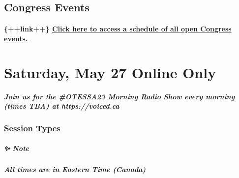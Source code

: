 \documentclass[
]{book}
\begin{document}
\hypertarget{congress-events}{%
\section*{Congress Events}\label{congress-events}}

\begin{vendor}
\hypertarget{link-click-here-to-access-a-schedule-of-all-open-congress-events.}{%
\subsubsection{\texorpdfstring{\{++link++\} \href{}{Click here to access
a schedule of all open Congress
events.}}{\{++link++\} Click here to access a schedule of all open Congress events.}}\label{link-click-here-to-access-a-schedule-of-all-open-congress-events.}}
\end{vendor}

\hypertarget{saturday-may-27-online-only}{%
\chapter{Saturday, May 27 \textbar{} Online Only}\label{saturday-may-27-online-only}}

\begin{protip}
\hypertarget{join-us-for-the-otessa23-morning-radio-show-every-morning-times-tba-at-httpsvoiced.ca}{%
\paragraph{Join us for the \#OTESSA23 Morning Radio Show every morning
(times TBA) at
https://voiced.ca}\label{join-us-for-the-otessa23-morning-radio-show-every-morning-times-tba-at-httpsvoiced.ca}}
\end{protip}

\hypertarget{session-types}{%
\subsection*{Session Types}\label{session-types}}

\begin{protip}
\hypertarget{note}{%
\paragraph*{✨ Note}\label{note}}

\textbf{\emph{All times are in Eastern Time (Canada)}}
\end{protip}
\end{document}
